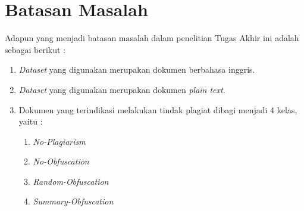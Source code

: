 \documentclass[../Proposal.tex]{subfiles}
\begin{document}
	\section{Batasan Masalah}
	\noindent Adapun yang menjadi batasan masalah dalam penelitian Tugas Akhir ini adalah sebagai berikut :
		\begin{enumerate}
			\item \textit{Dataset} yang digunakan merupakan dokumen berbahasa inggris. 
			\item \textit{Dataset} yang digunakan merupakan dokumen \textit{plain text}.
			\item Dokumen yang terindikasi melakukan tindak plagiat dibagi menjadi 4 kelas, yaitu :
				\begin{enumerate}
					\item \textit{No-Plagiarism}
					\item \textit{No-Obfuscation}
					\item \textit{Random-Obfuscation}
					\item \textit{Summary-Obfuscation}
				\end{enumerate}
		\end{enumerate}
\end{document}
